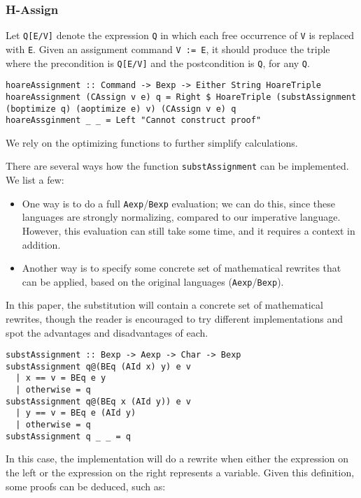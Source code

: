 \documentclass{article}
\theoremstyle{definition}
\begin{document}
\subsubsection{H-Assign}

Let \texttt{Q[E/V]} denote the expression \texttt{Q} in which each free occurrence of \texttt{V} is replaced with \texttt{E}. Given an assignment command \texttt{V := E}, it should produce the triple where the precondition is \texttt{Q[E/V]} and the postcondition is \texttt{Q}, for any \texttt{Q}.

\begin{lstlisting}
hoareAssignment :: Command -> Bexp -> Either String HoareTriple
hoareAssignment (CAssign v e) q = Right $ HoareTriple (substAssignment (boptimize q) (aoptimize e) v) (CAssign v e) q
hoareAssginment _ _ = Left "Cannot construct proof"
\end{lstlisting}

We rely on the optimizing functions to further simplify calculations.

There are several ways how the function \texttt{substAssignment} can be implemented. We list a few:

\begin{itemize}
\item One way is to do a full \texttt{Aexp}/\texttt{Bexp} evaluation; we can do this, since these languages are strongly normalizing, compared to our imperative language. However, this evaluation can still take some time, and it requires a context in addition.
\item Another way is to specify some concrete set of mathematical rewrites that can be applied, based on the original languages (\texttt{Aexp}/\texttt{Bexp}).
\end{itemize}

In this paper, the substitution will contain a concrete set of mathematical rewrites, though the reader is encouraged to try different implementations and spot the advantages and disadvantages of each.

\begin{lstlisting}
substAssignment :: Bexp -> Aexp -> Char -> Bexp
substAssignment q@(BEq (AId x) y) e v
  | x == v = BEq e y
  | otherwise = q
substAssignment q@(BEq x (AId y)) e v
  | y == v = BEq e (AId y)
  | otherwise = q
substAssignment q _ _ = q
\end{lstlisting}

In this case, the implementation will do a rewrite when either the expression on the left or the expression on the right represents a variable. Given this definition, some proofs can be deduced, such as:
\end{document}
